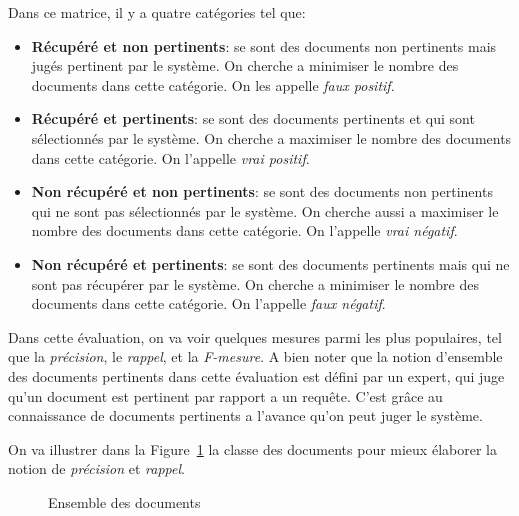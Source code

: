 Dans ce matrice, il y a quatre catégories tel que:
\begin{itemize}
	\item \textbf{Récupéré et non pertinents}: se sont des documents non pertinents mais jugés pertinent par le système. On cherche a minimiser le nombre des documents dans cette catégorie. On les appelle \emph{faux positif}.
	\item \textbf{Récupéré et pertinents}: se sont des documents pertinents et qui sont sélectionnés par le système. On cherche a maximiser le nombre des documents dans cette catégorie. On l'appelle \emph{vrai positif}.
	\item \textbf{Non récupéré et non pertinents}: se sont des documents non pertinents qui ne sont pas sélectionnés par le système. On cherche aussi a maximiser le nombre des documents dans cette catégorie. On l'appelle \emph{vrai négatif}.
	\item \textbf{Non récupéré et pertinents}: se sont des documents pertinents mais qui ne sont pas récupérer par le système. On cherche a minimiser le nombre des documents dans cette catégorie. On l'appelle \emph{faux négatif}.
\end{itemize}

Dans cette évaluation, on va voir quelques mesures parmi les plus populaires, tel que la \emph{précision}, le \emph{rappel}, et la \emph{F-mesure}. A bien noter que la notion d'ensemble des documents pertinents dans cette évaluation est défini par un expert, qui juge qu'un document est pertinent par rapport a un requête. C'est grâce au connaissance de documents pertinents a l'avance qu'on peut juger le système.

On va illustrer dans la Figure~\ref{fig:precision-recall} la classe des documents pour mieux élaborer la notion de \emph{précision} et \emph{rappel}.
\begin{figure}[htbp]
	\begin{center}
	\end{center}
	\caption{Ensemble des documents \citep{modern-ir}}\label{fig:precision-recall}
\end{figure}

